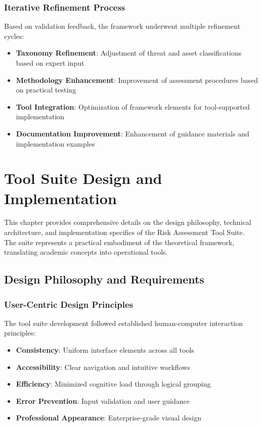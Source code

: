 \documentclass[binding=0.6cm]{sapthesis}
\begin{document}
\subsection{Iterative Refinement Process}

Based on validation feedback, the framework underwent multiple refinement cycles:

\begin{itemize}
    \item \textbf{Taxonomy Refinement}: Adjustment of threat and asset classifications based on expert input
    \item \textbf{Methodology Enhancement}: Improvement of assessment procedures based on practical testing
    \item \textbf{Tool Integration}: Optimization of framework elements for tool-supported implementation
    \item \textbf{Documentation Improvement}: Enhancement of guidance materials and implementation examples
\end{itemize}

\chapter{Tool Suite Design and Implementation}
\label{ch:implementation}

This chapter provides comprehensive details on the design philosophy, technical architecture, and implementation specifics of the Risk Assessment Tool Suite. The suite represents a practical embodiment of the theoretical framework, translating academic concepts into operational tools.

\section{Design Philosophy and Requirements}

\subsection{User-Centric Design Principles}

The tool suite development followed established human-computer interaction principles:

\begin{itemize}
    \item \textbf{Consistency}: Uniform interface elements across all tools
    \item \textbf{Accessibility}: Clear navigation and intuitive workflows
    \item \textbf{Efficiency}: Minimized cognitive load through logical grouping
    \item \textbf{Error Prevention}: Input validation and user guidance
    \item \textbf{Professional Appearance}: Enterprise-grade visual design
\end{itemize}
\end{document}
